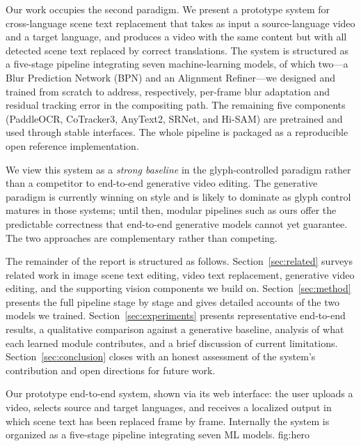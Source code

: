 Our work occupies the second paradigm. We present a prototype system
for cross-language scene text replacement that takes as input a
source-language video and a target language, and produces a video
with the same content but with all detected scene text replaced by
correct translations. The system is structured as a five-stage
pipeline integrating seven machine-learning models, of which two---a
Blur Prediction Network (BPN) and an Alignment Refiner---we designed
and trained from scratch to address, respectively, per-frame blur
adaptation and residual tracking error in the compositing path. The
remaining five components (PaddleOCR, CoTracker3, AnyText2, SRNet,
and Hi-SAM) are pretrained and used through stable interfaces. The
whole pipeline is packaged as a reproducible open reference
implementation.

We view this system as a \emph{strong baseline} in the
glyph-controlled paradigm rather than a competitor to end-to-end
generative video editing. The generative paradigm is currently
winning on style and is likely to dominate as glyph control matures
in those systems; until then, modular pipelines such as ours offer
the predictable correctness that end-to-end generative models cannot
yet guarantee. The two approaches are complementary rather than
competing.

The remainder of the report is structured as follows.
Section~\ref{sec:related} surveys related work in image scene text
editing, video text replacement, generative video editing, and the
supporting vision components we build on.
Section~\ref{sec:method} presents the full pipeline stage by stage
and gives detailed accounts of the two models we trained.
Section~\ref{sec:experiments} presents representative end-to-end
results, a qualitative comparison against a generative baseline,
analysis of what each learned module contributes, and a brief
discussion of current limitations. Section~\ref{sec:conclusion}
closes with an honest assessment of the system's contribution and
open directions for future work.

%
  {Our prototype end-to-end system, shown via its web interface:
   the user uploads a video, selects source and target languages,
   and receives a localized output in which scene text has been
   replaced frame by frame. Internally the system is organized as a
   five-stage pipeline integrating seven ML models.}%
  {fig:hero}
